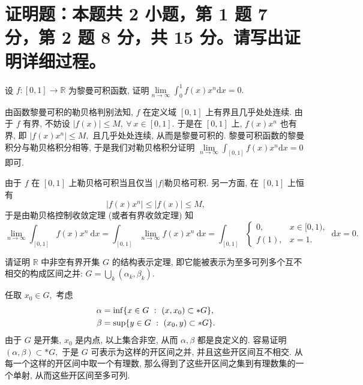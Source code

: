\fi




\section{%
  证明题：本题共 2 小题，第 1 题 7 分，第 2 题 8 分，共 15 分。请写出证明详细过程。
}


\begin{question}[points = 7]
设 $f: [0, 1] \to \mathbb{R}$ 为黎曼可积函数, 证明$\lim\limits_{n\to\infty} \int_0^1 f(x) x^n \mathrm{d} x = 0.$
\end{question}

\begin{solution}
由函数黎曼可积的勒贝格判别法知, $f$ 在定义域 $[0, 1]$ 上有界且几乎处处连续. 由于 $f$ 有界, 不妨设 $\lvert f(x) \rvert \leqslant M, ~ \forall ~ x \in [0, 1].$
于是在 $[0, 1]$ 上, $f(x) x^n$ 也有界, 即 $|f(x) x^n| \leqslant M,$ 且几乎处处连续, 从而是黎曼可积的. 黎曼可积函数的黎曼积分与勒贝格积分相等,
于是我们对勒贝格积分证明 $\lim\limits_{n\to\infty} \int_{[0, 1]} f(x) x^n \mathrm{d} x = 0$ 即可. 

由于 $f$ 在 $[0, 1]$ 上勒贝格可积当且仅当 $\lvert f \rvert$勒贝格可积. 
另一方面, 在 $[0, 1]$ 上恒有
$$\lvert f(x) x^n \rvert \leqslant \lvert f(x) \rvert \leqslant M,$$
于是由勒贝格控制收敛定理 (或者有界收敛定理) 知 
$$\lim\limits_{n\to\infty} \int_{[0, 1]} f(x) x^n ~ \mathrm{d} x = \int_{[0, 1]} \lim\limits_{n\to\infty} f(x) x^n ~ \mathrm{d} x = \int_{[0, 1]} \begin{cases}
0, & x \in [0, 1), \\
f(1), & x = 1.
\end{cases} ~ \mathrm{d} x = 0.$$
\end{solution}

\begin{question}[points = 8]
请证明 $\mathbb{R}$ 中非空有界开集 $G$ 的结构表示定理, 即它能被表示为至多可列多个互不相交的构成区间之并: $G = \bigcup\limits_{k} (\alpha_k, \beta_k).$
\end{question}

\begin{solution}
任取 $x_0 \in G,$ 考虑
\begin{equation*}
\begin{aligned}
\alpha & = \inf \{ x \in G ~ : ~ (x, x_0) \subset* G \}, \\
\beta & = \sup \{ y \in G ~ : ~ (x_0, y) \subset* G \}.
\end{aligned} \score{2}
\end{equation*}
由于 $G$ 是开集, $x_0$ 是内点, 以上集合非空, 从而 $\alpha, \beta$ 都是良定义的. 
容易证明 $(\alpha, \beta) \subset* G,$ 于是 $G$ 可表示为这样的开区间之并, 并且这些开区间互不相交. 
从每一个这样的开区间中取一个有理数, 那么得到了这些开区间之集到有理数集的一个单射, 从而这些开区间至多可列. 
\end{solution}


